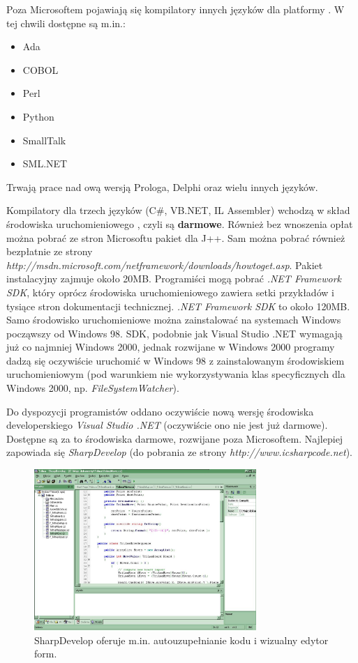 Poza Microsoftem pojawiają się kompilatory innych języków dla platformy \NET. W tej chwili dostępne są
m.in.:
\begin{itemize}
	\item Ada
	\item COBOL
	\item Perl
	\item Python
	\item SmallTalk
	\item SML.NET
\end{itemize}

Trwają prace nad \NET ową wersją Prologa, Delphi oraz wielu innych języków. 

Kompilatory dla trzech języków (C\#, VB.NET, IL Assembler) wchodzą w skład środowiska 
uruchomieniowego \NETFramework, czyli są {\bf darmowe}. Również bez wnoszenia opłat można pobrać ze stron 
Microsoftu pakiet dla J++. 
Sam \NETFramework{} można pobrać również bezpłatnie ze strony
{\em http://msdn.microsoft.com/netframework/downloads/howtoget.asp}. Pakiet instalacyjny zajmuje około
20MB. Programiści mogą pobrać {\em .NET Framework SDK}, który oprócz środowiska uruchomieniowego
zawiera setki przykładów i tysiące stron dokumentacji technicznej. {\em .NET Framework SDK} to około 120MB.
Samo środowisko uruchomieniowe można zainstalować na systemach Windows począwszy od Windows 98. \NETFramework{}
SDK, podobnie jak Visual Studio .NET wymagają już co najmniej Windows 2000, jednak rozwijane 
w Windows 2000 programy dadzą się oczywiście uruchomić w Windows 98 z zainstalowanym 
środowiskiem uruchomieniowym \NET{} (pod warunkiem
nie wykorzystywania klas specyficznych dla Windows 2000, np. {\em FileSystemWatcher}).

Do dyspozycji programistów oddano oczywiście nową wersję środowiska developerskiego {\em Visual Studio .NET}
(oczywiście ono nie jest już darmowe). Dostępne są za to środowiska darmowe, 
rozwijane poza Microsoftem. Najlepiej zapowiada się
{\em SharpDevelop} (do pobrania ze strony {\em http://www.icsharpcode.net}).

\begin{figure}
\begin{center}
\includegraphics[width=0.75\textwidth]{./pic/w00}
\caption{SharpDevelop oferuje m.in. autouzupełnianie kodu i wizualny edytor form.}
\end{center}
\end{figure}

